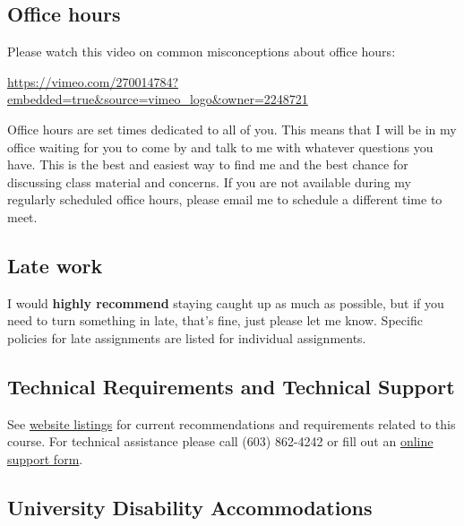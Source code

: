 \documentclass[
  letterpaper,
  DIV=11,
  numbers=noendperiod]{scrreprt}
\begin{document}

\hypertarget{office-hours}{%
\subsection*{Office hours}\label{office-hours}}

Please watch this video on common misconceptions about office hours:

\url{https://vimeo.com/270014784?embedded=true\&source=vimeo_logo\&owner=2248721}

Office hours are set times dedicated to all of you. This means that I
will be in my office waiting for you to come by and talk to me with
whatever questions you have. This is the best and easiest way to find me
and the best chance for discussing class material and concerns. If you
are not available during my regularly scheduled office hours, please
email me to schedule a different time to meet.

\hypertarget{late-work}{%
\subsection*{Late work}\label{late-work}}

I would \textbf{highly recommend} staying caught up as much as possible,
but if you need to turn something in late, that's fine, just please let
me know. Specific policies for late assignments are listed for
individual assignments.

\hypertarget{technical-requirements-and-technical-support}{%
\subsection*{Technical Requirements and Technical
Support}\label{technical-requirements-and-technical-support}}

See \href{https://online.unh.edu/technical-requirements}{website
listings} for current recommendations and requirements related to this
course. For technical assistance please call (603) 862-4242 or fill out
an \href{https://itsupport.unh.edu/onlinelearning/}{online support
form}.

\hypertarget{university-disability-accommodations}{%
\subsection*{University Disability
Accommodations}\label{university-disability-accommodations}}
\end{document}
